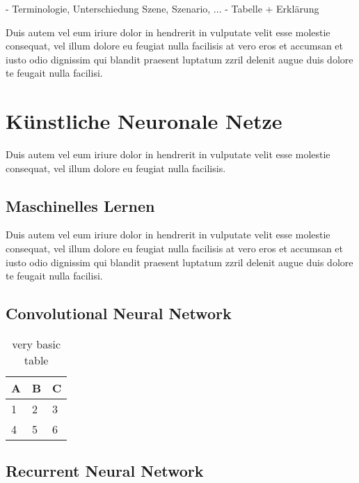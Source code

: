 - Terminologie, Unterschiedung Szene, Szenario, ...
- Tabelle + Erklärung

Duis autem vel eum iriure dolor in hendrerit in vulputate velit esse molestie consequat, vel illum dolore eu feugiat nulla facilisis at vero eros et accumsan et iusto odio dignissim qui blandit praesent luptatum zzril delenit augue duis dolore te feugait nulla facilisi.   


\section{Künstliche Neuronale Netze}
\label{grundlagen_nn}

Duis autem vel eum iriure dolor in hendrerit in vulputate velit esse molestie consequat, vel illum dolore eu feugiat nulla facilisis.


\subsection{Maschinelles Lernen}
\label{grundlagen_nn_ml}

Duis autem vel eum iriure dolor in hendrerit in vulputate velit esse molestie consequat, vel illum dolore eu feugiat nulla facilisis at vero eros et accumsan et iusto odio dignissim qui blandit praesent luptatum zzril delenit augue duis dolore te feugait nulla facilisi. 


\subsection{Convolutional Neural Network}
\label{grundlagen_nn_cnn}


\begin{table}[h]
\centering
\begin{tabular}{l | l | l}
A & B & C \\
\hline
1 & 2 & 3 \\
4 & 5 & 6
\end{tabular}
\caption{very basic table}
\label{tab:abc}
\end{table}


\subsection{Recurrent Neural Network}
\label{grundlagen_nn_rnn}


